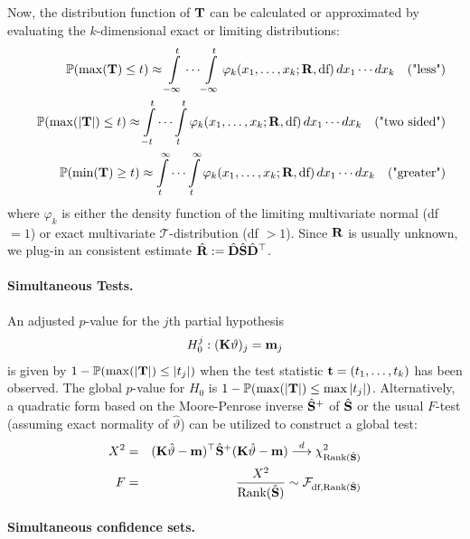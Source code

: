 \documentclass[12pt]{article}
\begin{document}
Now, the distribution function of $\T$ can be calculated or approximated
by evaluating the $k$-dimensional exact or limiting distributions:
\begin{eqnarray*}
& & \Prob(\max(\T) \le t)  \approx \int\limits_{-\infty}^t \cdots \int\limits_{-\infty}^t 
\varphi_k(x_1, \dots, x_k; \Cor, \text{df}) \, dx_1 \cdots dx_k \quad \text{("less")}\\
& & \Prob(\max(|\T|) \le t)  \approx  \int\limits_{-t}^t \cdots \int\limits_{t}^t 
\varphi_k(x_1, \dots, x_k; \Cor, \text{df}) \, dx_1 \cdots dx_k \quad \text{("two sided")}\\
& & \Prob(\min(\T) \ge t) \approx  \int\limits_{t}^\infty \cdots \int\limits_{t}^\infty 
\varphi_k(x_1, \dots, x_k; \Cor, \text{df}) \, dx_1 \cdots dx_k \quad \text{("greater")}\\
\end{eqnarray*}
where $\varphi_k$ is either the density function of the limiting multivariate
normal (df $ = 1$) or exact multivariate $\mathcal{T}$-distribution (df $ > 1$).
Since $\Cor$ is usually unknown, we plug-in an consistent estimate
$\hat{\Cor} := \hat{\D} \hat{\S} \hat{\D}^\top$.

\paragraph{Simultaneous Tests.}

An adjusted $p$-value for the $j$th partial hypothesis 
\begin{eqnarray*}
H_0^j: (\K \vartheta)_j = \m_j
\end{eqnarray*}
is given by $1 - \Prob(\max(|\T|) \le |t_j|)$ when the test statistic 
$\t  = (t_1, \dots, t_k)$
has been observed. The global $p$-value for $H_0$ is $1 - \Prob(\max(|\T|) \le \max|t_j|)$.
Alternatively, a quadratic form based on the Moore-Penrose inverse $\hat{\S}^+$ of 
$\hat{\S}$ or the usual $F$-test (assuming exact normality of $\hat{\vartheta}$) 
can be utilized to construct a global test:
\begin{eqnarray*}
X^2 & = & (\K \hat{\vartheta} - \m)^\top \hat{\S}^+ (\K \hat{\vartheta} - \m) \cL \chi^2_{\Rg(\hat{\S})} \\
F & = &  \frac{X^2}{\Rg(\hat{\S})} \sim \F_{\text{df}, \Rg(\hat{\S})}
\end{eqnarray*}

\paragraph{Simultaneous confidence sets.}
\end{document}
